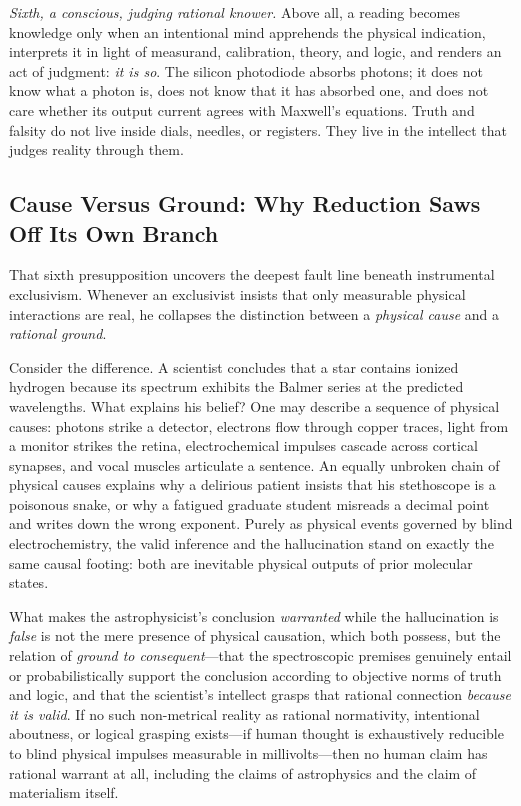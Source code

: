 \emph{Sixth, a conscious, judging rational knower.} Above all, a reading becomes knowledge only when an intentional mind apprehends the physical indication, interprets it in light of measurand, calibration, theory, and logic, and renders an act of judgment: \emph{it is so}. The silicon photodiode absorbs photons; it does not know what a photon is, does not know that it has absorbed one, and does not care whether its output current agrees with Maxwell's equations. Truth and falsity do not live inside dials, needles, or registers. They live in the intellect that judges reality through them.

\subsection{Cause Versus Ground: Why Reduction Saws Off Its Own Branch}

That sixth presupposition uncovers the deepest fault line beneath instrumental exclusivism. Whenever an exclusivist insists that only measurable physical interactions are real, he collapses the distinction between a \emph{physical cause} and a \emph{rational ground}.

Consider the difference. A scientist concludes that a star contains ionized hydrogen because its spectrum exhibits the Balmer series at the predicted wavelengths. What explains his belief? One may describe a sequence of physical causes: photons strike a detector, electrons flow through copper traces, light from a monitor strikes the retina, electrochemical impulses cascade across cortical synapses, and vocal muscles articulate a sentence. An equally unbroken chain of physical causes explains why a delirious patient insists that his stethoscope is a poisonous snake, or why a fatigued graduate student misreads a decimal point and writes down the wrong exponent. Purely as physical events governed by blind electrochemistry, the valid inference and the hallucination stand on exactly the same causal footing: both are inevitable physical outputs of prior molecular states.

What makes the astrophysicist's conclusion \emph{warranted} while the hallucination is \emph{false} is not the mere presence of physical causation, which both possess, but the relation of \emph{ground to consequent}---that the spectroscopic premises genuinely entail or probabilistically support the conclusion according to objective norms of truth and logic, and that the scientist's intellect grasps that rational connection \emph{because it is valid}. If no such non-metrical reality as rational normativity, intentional aboutness, or logical grasping exists---if human thought is exhaustively reducible to blind physical impulses measurable in millivolts---then no human claim has rational warrant at all, including the claims of astrophysics and the claim of materialism itself.

